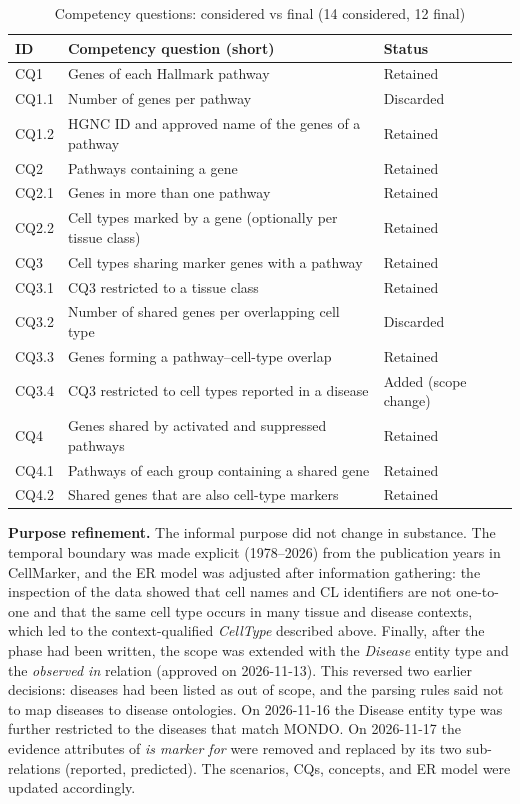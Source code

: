 \begin{table}[htbp]
\centering
\small
\begin{tabularx}{\linewidth}{|l|X|l|}
\hline
\textbf{ID} & \textbf{Competency question (short)} & \textbf{Status} \\ \hline
CQ1 & Genes of each Hallmark pathway & Retained \\ \hline
CQ1.1 & Number of genes per pathway & Discarded \\ \hline
CQ1.2 & HGNC ID and approved name of the genes of a pathway & Retained \\ \hline
CQ2 & Pathways containing a gene & Retained \\ \hline
CQ2.1 & Genes in more than one pathway & Retained \\ \hline
CQ2.2 & Cell types marked by a gene (optionally per tissue class) & Retained \\ \hline
CQ3 & Cell types sharing marker genes with a pathway & Retained \\ \hline
CQ3.1 & CQ3 restricted to a tissue class & Retained \\ \hline
CQ3.2 & Number of shared genes per overlapping cell type & Discarded \\ \hline
CQ3.3 & Genes forming a pathway--cell-type overlap & Retained \\ \hline
CQ3.4 & CQ3 restricted to cell types reported in a disease & Added (scope change) \\ \hline
CQ4 & Genes shared by activated and suppressed pathways & Retained \\ \hline
CQ4.1 & Pathways of each group containing a shared gene & Retained \\ \hline
CQ4.2 & Shared genes that are also cell-type markers & Retained \\ \hline
\end{tabularx}
\caption{Competency questions: considered vs final (14 considered, 12 final)}
\end{table}

\medskip\noindent\textbf{Purpose refinement.} The informal purpose did not change in substance. The temporal boundary was made explicit (1978--2026) from the publication years in CellMarker, and the ER model was adjusted after information gathering: the inspection of the data showed that cell names and CL identifiers are not one-to-one and that the same cell type occurs in many tissue and disease contexts, which led to the context-qualified \emph{CellType} described above. Finally, after the phase had been written, the scope was extended with the \emph{Disease} entity type and the \emph{observed in} relation (approved on 2026-11-13). This reversed two earlier decisions: diseases had been listed as out of scope, and the parsing rules said not to map diseases to disease ontologies. On 2026-11-16 the Disease entity type was further restricted to the diseases that match MONDO. On 2026-11-17 the evidence attributes of \emph{is marker for} were removed and replaced by its two sub-relations (reported, predicted). The scenarios, CQs, concepts, and ER model were updated accordingly.

